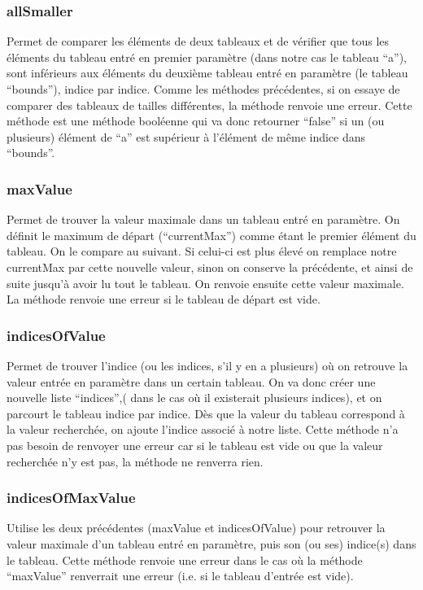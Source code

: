 \documentclass[11pt]{article}
\begin{document}
\subsubsection{allSmaller}
Permet de comparer les éléments de deux tableaux et de vérifier que tous les éléments du tableau entré en premier paramètre (dans notre cas le tableau “a”), sont inférieurs aux éléments du deuxième tableau entré en paramètre (le tableau “bounds”), indice par indice. Comme les méthodes précédentes, si on essaye de comparer des tableaux de tailles différentes, la méthode renvoie une erreur. Cette méthode est une méthode booléenne qui va donc retourner “false” si un (ou plusieurs) élément de “a” est supérieur à l’élément de même indice dans “bounds”. 

\subsubsection{maxValue}
Permet de trouver la valeur maximale dans un tableau entré en paramètre. On définit le maximum de départ (“currentMax”) comme étant le premier élément du tableau. On le compare au suivant. Si celui-ci est plus élevé on remplace notre currentMax par cette nouvelle valeur, sinon on conserve la précédente, et ainsi de suite jusqu’à avoir lu tout le tableau. On renvoie ensuite cette valeur maximale. La méthode renvoie une erreur si le tableau de départ est vide.

\subsubsection{indicesOfValue}
Permet de trouver l’indice (ou les indices, s’il y en a plusieurs) où on retrouve la valeur entrée en paramètre dans un certain tableau. On va donc créer une nouvelle liste “indices”,( dans le cas où il existerait plusieurs indices), et on parcourt le tableau indice par indice. Dès que la valeur du tableau correspond à la valeur recherchée, on ajoute l’indice associé à notre liste. Cette méthode n’a pas besoin de renvoyer une erreur car si le tableau est vide ou que la valeur recherchée n’y est pas, la méthode ne renverra rien. 

\subsubsection{indicesOfMaxValue}
Utilise les deux  précédentes (maxValue et indicesOfValue) pour retrouver la valeur maximale d’un tableau entré en paramètre, puis son (ou ses) indice(s) dans le tableau. Cette méthode renvoie une erreur dans le cas où la méthode “maxValue” renverrait une erreur (i.e. si le tableau d’entrée est vide). 
\end{document}
